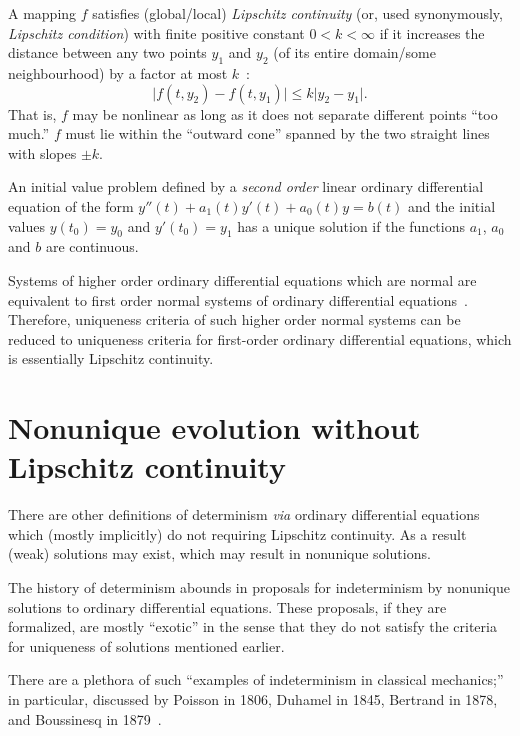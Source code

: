A mapping $f$ satisfies (global/local) {\em Lipschitz continuity} (or, used synonymously,   {\em Lipschitz condition})
with finite positive constant $0<k<\infty$ if
it increases the distance between any two points $y_1$ and $y_2$ (of its entire domain/some neighbourhood)
by a factor at most $k$~\cite[Sect.~4.3, p.~272]{Arnold-ode}:
\begin{equation}
\vert f(t,y_2)-f(t,y_1) \vert \le k \vert y_2 - y_1 \vert
.
\end{equation}
That is,
$f$ may be nonlinear as long as it does not separate different points ``too much.''
$f$ must lie within the ``outward cone'' spanned by the two straight lines with slopes $\pm k$.

An  initial value problem
defined by a {\em  second  order} linear ordinary differential equation of the form $y''(t) + a_1(t) y'(t) + a_0(t) y = b(t)$
and the initial values $y(t_0)=y_0$  and $y'(t_0)=y_1$
has a unique solution if the functions $a_1$, $a_0$ and $b$ are continuous.

Systems of higher order  ordinary differential equations  which are normal
are equivalent to first order normal  systems of  ordinary differential equations~\cite[Theorem~4, p.~180]{birkhoff-Rota-48}.
Therefore, uniqueness criteria of such higher order  normal systems  can be reduced to
uniqueness criteria for first-order ordinary differential equations, which is essentially  Lipschitz continuity.


\section{Nonunique evolution without Lipschitz continuity}
\label{2016-pu-book-chapter-eu-nuewlc}


There are other definitions of determinism {\it via} ordinary differential equations
which (mostly implicitly) do not requiring Lipschitz continuity.
As a result (weak) solutions may exist, which may result in nonunique solutions.

The history of determinism abounds in proposals for indeterminism by nonunique solutions to ordinary differential equations.
These proposals,
if they are formalized,
are mostly ``exotic'' in the sense that they do not satisfy the criteria for uniqueness of solutions mentioned earlier.

There are a plethora of such ``examples of indeterminism in classical mechanics;''
in particular, discussed by Poisson in 1806, Duhamel in 1845, Bertrand in 1878,   and Boussinesq in 1879~\cite{Deakin1988,vanStrien2014}.

